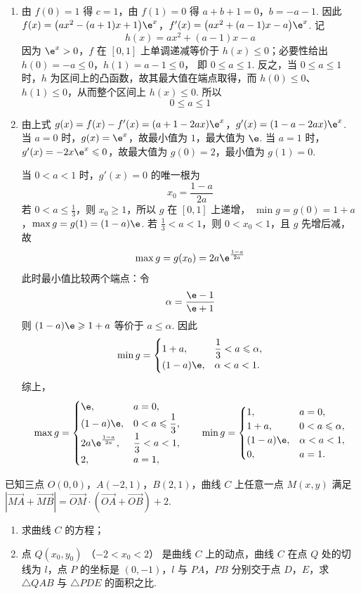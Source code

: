 \begin{solution}
\begin{enumerate}
\item 由 \(f(0)=1\) 得 \(c=1\)，由 \(f(1)=0\) 得
\(a+b+1=0\)，\(b=-a-1\).
因此
\(f(x)=\bigl(ax^2-(a+1)x+1\bigr)\e^x\)，\(f'(x)=\bigl(ax^2+(a-1)x-a\bigr)\e^x\).
记
\[
h(x)=ax^2+(a-1)x-a
\]
因为 \(\e^x>0\)，\(f\) 在 \([0,1]\) 上单调递减等价于 \(h(x)\leqslant0\)；必要性给出
\(h(0)=-a\leqslant0\)，\(h(1)=a-1\leqslant0\)，
即 \(0\leqslant a\leqslant1\). 反之，当 \(0\leqslant a\leqslant1\) 时，\(h\) 为区间上的凸函数，故其最大值在端点取得，而
\(h(0)\leqslant0\)、\(h(1)\leqslant0\)，从而整个区间上 \(h(x)\leqslant0\). 所以
\[
0\leqslant a\leqslant1
\]

\item 由上式
\(g(x)=f(x)-f'(x)=(a+1-2ax)\e^x\)，\(g'(x)=(1-a-2ax)\e^x\).
当 \(a=0\) 时，\(g(x)=\e^x\)，故最小值为 \(1\)，最大值为 \(\e\). 当 \(a=1\) 时，
\(g'(x)=-2x\e^x\leqslant0\)，故最大值为 \(g(0)=2\)，最小值为 \(g(1)=0\).

当 \(0<a<1\) 时，\(g'(x)=0\) 的唯一根为
\[
x_0=\frac{1-a}{2a}
\]
若 \(0<a\leqslant\frac13\)，则 \(x_0\geqslant1\)，所以 \(g\) 在 \([0,1]\) 上递增，
\(\min g=g(0)=1+a\)，\(\max g=g(1)=(1-a)\e\).
若 \(\frac13<a<1\)，则 \(0<x_0<1\)，且 \(g\) 先增后减，故
\[
\max g=g(x_0)=2a\e^{\frac{1-a}{2a}}
\]
此时最小值比较两个端点：令
\[
\alpha=\frac{\e-1}{\e+1}
\]
则 \((1-a)\e\geqslant1+a\) 等价于 \(a\leqslant\alpha\). 因此
\[
\min g=
\begin{cases}
1+a,&\dfrac13<a\leqslant\alpha,\\
(1-a)\e,&\alpha<a<1.
\end{cases}
\]
综上，
\[
\max g=
\begin{cases}
\e,&a=0,\\
(1-a)\e,&0<a\leqslant\dfrac13,\\
2a\e^{\frac{1-a}{2a}},&\dfrac13<a<1,\\
2,&a=1,
\end{cases}
\qquad
\min g=
\begin{cases}
1,&a=0,\\
1+a,&0<a\leqslant\alpha,\\
(1-a)\e,&\alpha<a<1,\\
0,&a=1.
\end{cases}
\]
\end{enumerate}
\end{solution}

\begin{problem}
已知三点 \(O(0,0)\)，\(A(-2,1)\)，\(B(2,1)\)，曲线 \(C\) 上任意一点 \(M(x,y)\) 满足 \(\left|\overrightarrow{MA} + \overrightarrow{MB}\right| = \overrightarrow{OM} \cdot \left(\overrightarrow{OA} + \overrightarrow{OB}\right) + 2\).
\begin{enumerate}
\item 求曲线 \(C\) 的方程；
\item 点 \(Q(x_0, y_0)\) （\(-2 < x_0 < 2\)） 是曲线 \(C\) 上的动点，曲线 \(C\) 在点 \(Q\) 处的切线为 \(l\)，点 \(P\) 的坐标是 \((0, -1)\)，\(l\) 与 \(PA\)，\(PB\) 分别交于点 \(D\)，\(E\)，求 \(\triangle QAB\) 与 \(\triangle PDE\) 的面积之比.
\end{enumerate}
\end{problem}

